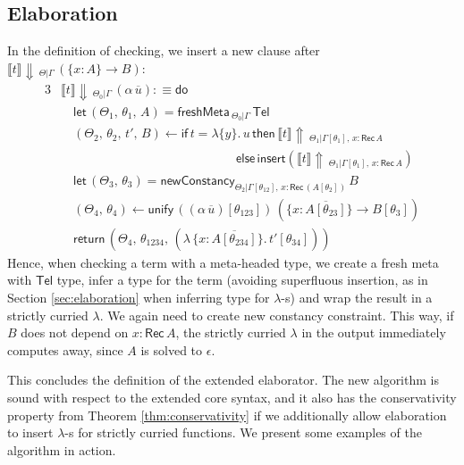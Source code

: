 \documentclass[acmsmall,review,anonymous,prologue,dvipsnames]{acmart}\settopmatter{printfolios=true,printccs=false,printacmref=false}
\newcommand{\slet}{\boldsymbol{\mathsf{let}}}
\newcommand{\freshMeta}[3]{\mathsf{freshMeta}\,_{#1|#2}\,#3}
\newcommand{\newConstancy}[5]{\mathsf{newConstancy}_{#1|#2,\,#3 : \Rec\,#4}\,#5}
\newcommand{\unify}{\mathsf{unify}}
\newcommand{\echeck}[4]{\llbracket#1\rrbracket\!\Downarrow\,_{#2|#3}\,#4}
\newcommand{\einfer}[3]{\llbracket#1\rrbracket\!\Uparrow\,_{#2|#3}}
\newcommand{\edo}{\boldsymbol{\mathsf{do}}}
\newcommand{\ereturn}{\boldsymbol{\mathsf{return}}}
\newcommand{\eif}{\boldsymbol{\mathsf{if}}}
\newcommand{\ethen}{\boldsymbol{\mathsf{then}}}
\newcommand{\eelse}{\boldsymbol{\mathsf{else}}}
\newcommand{\einsert}{\mathsf{insert}}
\newcommand{\Tel}{\mathsf{Tel}}
\newcommand{\Rec}{\mathsf{Rec}}
\newcommand{\ol}[1]{\overline{#1}}
\theoremstyle{remark}
\begin{document}
\subsection{Elaboration}

In the definition of checking, we insert a new clause after
$\echeck{t}{\Theta}{\Gamma}{(\{x : A\}\to B)}$:
\begin{alignat*}{3}
& \echeck{t}{\Theta_0}{\Gamma}{(\alpha\,\ol{u})} :\equiv \edo\\
& \quad \slet\,(\Theta_1,\,\theta_1,\,A) = \freshMeta{\Theta_0}{\Gamma}{\Tel}\\
&\quad(\Theta_2,\,\theta_2,\,t',\,B)\leftarrow \eif\,t = \lambda\{y\}.\,u\,\ethen\,\einfer{t}{\Theta_1}{\Gamma[\theta_1],\,x:\Rec\,A}\\
  &\quad\quad\hspace{12em} \eelse\,\einsert(\einfer{t}{\Theta_1}{\Gamma[\theta_1],\,x:\Rec\,A}) \\
& \quad \slet\,(\Theta_3,\,\theta_3) = \newConstancy{\Theta_2}{\Gamma[\theta_{12}]}{x}{(A[\theta_2])}{B}\\
& \quad (\Theta_4,\,\theta_4) \leftarrow
            \unify\, ((\alpha\,\ol{u})[\theta_{123}])\,(\{x : \ol{A[\theta_{23}]}\} \to B[\theta_3])\\
& \quad \ereturn\,(\Theta_4,\,\theta_{1234},\,(\lambda\,\{x : \ol{A[\theta_{234}]}\}.\,t'[\theta_{34}]))
\end{alignat*}
Hence, when checking a term with a meta-headed type, we create a fresh meta with
$\Tel$ type, infer a type for the term (avoiding superfluous insertion, as in
Section \ref{sec:elaboration} when inferring type for $\lambda$-s) and wrap the
result in a strictly curried $\lambda$. We again need to create new constancy
constraint. This way, if $B$ does not depend on $x : \Rec\,A$, the strictly
curried $\lambda$ in the output immediately computes away, since $A$ is solved
to $\epsilon$.

This concludes the definition of the extended elaborator. The new algorithm is
sound with respect to the extended core syntax, and it also has the
conservativity property from Theorem \ref{thm:conservativity} if we additionally
allow elaboration to insert $\lambda$-s for strictly curried functions. We present
some examples of the algorithm in action.
\end{document}
